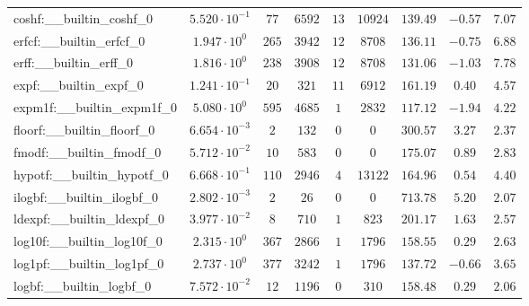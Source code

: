 \begin{tabular}{|l|c|c|c|c|c|c|c|c|}
coshf:\_\_builtin\_coshf\_0               & $ 5.520 \cdot 10^{-1} $ & $ 77     $ & $ 6592   $ & $ 13  $ & $ 10924  $ & $ 139.49      $ & $ -0.57   $ & $ 7.07    $ \\
erfcf:\_\_builtin\_erfcf\_0               & $ 1.947 \cdot 10^{0}  $ & $ 265    $ & $ 3942   $ & $ 12  $ & $ 8708   $ & $ 136.11      $ & $ -0.75   $ & $ 6.88    $ \\
erff:\_\_builtin\_erff\_0                 & $ 1.816 \cdot 10^{0}  $ & $ 238    $ & $ 3908   $ & $ 12  $ & $ 8708   $ & $ 131.06      $ & $ -1.03   $ & $ 7.78    $ \\
expf:\_\_builtin\_expf\_0                 & $ 1.241 \cdot 10^{-1} $ & $ 20     $ & $ 321    $ & $ 11  $ & $ 6912   $ & $ 161.19      $ & $ 0.40    $ & $ 4.57    $ \\
expm1f:\_\_builtin\_expm1f\_0             & $ 5.080 \cdot 10^{0}  $ & $ 595    $ & $ 4685   $ & $ 1   $ & $ 2832   $ & $ 117.12      $ & $ -1.94   $ & $ 4.22    $ \\
floorf:\_\_builtin\_floorf\_0             & $ 6.654 \cdot 10^{-3} $ & $ 2      $ & $ 132    $ & $ 0   $ & $ 0      $ & $ 300.57      $ & $ 3.27    $ & $ 2.37    $ \\
fmodf:\_\_builtin\_fmodf\_0               & $ 5.712 \cdot 10^{-2} $ & $ 10     $ & $ 583    $ & $ 0   $ & $ 0      $ & $ 175.07      $ & $ 0.89    $ & $ 2.83    $ \\
hypotf:\_\_builtin\_hypotf\_0             & $ 6.668 \cdot 10^{-1} $ & $ 110    $ & $ 2946   $ & $ 4   $ & $ 13122  $ & $ 164.96      $ & $ 0.54    $ & $ 4.40    $ \\
ilogbf:\_\_builtin\_ilogbf\_0             & $ 2.802 \cdot 10^{-3} $ & $ 2      $ & $ 26     $ & $ 0   $ & $ 0      $ & $ 713.78      $ & $ 5.20    $ & $ 2.07    $ \\
ldexpf:\_\_builtin\_ldexpf\_0             & $ 3.977 \cdot 10^{-2} $ & $ 8      $ & $ 710    $ & $ 1   $ & $ 823    $ & $ 201.17      $ & $ 1.63    $ & $ 2.57    $ \\
log10f:\_\_builtin\_log10f\_0             & $ 2.315 \cdot 10^{0}  $ & $ 367    $ & $ 2866   $ & $ 1   $ & $ 1796   $ & $ 158.55      $ & $ 0.29    $ & $ 2.63    $ \\
log1pf:\_\_builtin\_log1pf\_0             & $ 2.737 \cdot 10^{0}  $ & $ 377    $ & $ 3242   $ & $ 1   $ & $ 1796   $ & $ 137.72      $ & $ -0.66   $ & $ 3.65    $ \\
logbf:\_\_builtin\_logbf\_0               & $ 7.572 \cdot 10^{-2} $ & $ 12     $ & $ 1196   $ & $ 0   $ & $ 310    $ & $ 158.48      $ & $ 0.29    $ & $ 2.06    $ \\

\end{tabular}
